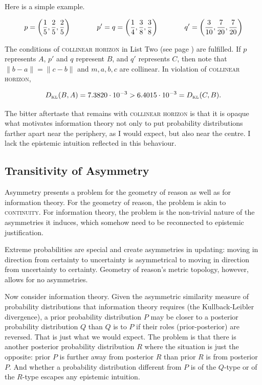 \documentclass[11pt]{article}
\begin{document}
Here is a simple example.

\begin{equation}
  \label{eq:ubiesohx}
  p=\left(\frac{1}{5},\frac{2}{5},\frac{2}{5}\right) \hspace{.5in}
  p'=q=\left(\frac{1}{4},\frac{3}{8},\frac{3}{8}\right)  \hspace{.5in}
  q'=\left(\frac{3}{10},\frac{7}{20},\frac{7}{20}\right)
\end{equation}

The conditions of \textsc{collinear horizon} in List Two (see page
\pageref{page:listtwo}) are fulfilled. If $p$ represents $A$, $p'$ and
$q$ represent $B$, and $q'$ represents $C$, then note that
$\|b-a\|=\|c-b\|$ and $m,a,b,c$ are collinear. In violation of
\textsc{collinear horizon},

\begin{equation}
  \label{eq:eiloothu}
  D_{\mbox{\tiny KL}}(B,A)=7.3820\cdot{}10^{-3}>6.4015\cdot{}10^{-3}=D_{\mbox{\tiny KL}}(C,B).
\end{equation}

The bitter aftertaste that remains with \textsc{collinear horizon} is
that it is opaque what motivates information theory not only to put
probability distributions farther apart near the periphery, as I would
expect, but also near the centre. I lack the epistemic intuition
reflected in this behaviour.

\subsection{Transitivity of Asymmetry}
\label{subsec:Asymmetry}

Asymmetry presents a problem for the geometry of reason as well as for
information theory. For the geometry of reason, the problem is akin to
\textsc{continuity}. For information theory, the problem is the
non-trivial nature of the asymmetries it induces, which somehow need
to be reconnected to epistemic justification. 

Extreme probabilities are special and create asymmetries in updating:
moving in direction from certainty to uncertainty is asymmetrical to
moving in direction from uncertainty to certainty. Geometry of
reason's metric topology, however, allows for no asymmetries.

Now consider information theory. Given the asymmetric similarity
measure of probability distributions that information theory requires
(the Kullback-Leibler divergence), a prior probability distribution
$P$ may be closer to a posterior probability distribution $Q$ than $Q$
is to $P$ if their roles (prior-posterior) are reversed. That is just
what we would expect. The problem is that there is another posterior
probability distribution $R$ where the situation is just the opposite:
prior $P$ is further away from posterior $R$ than prior $R$ is from
posterior $P$. And whether a probability distribution different from
$P$ is of the $Q$-type or of the $R$-type escapes any epistemic
intuition.
\end{document}
